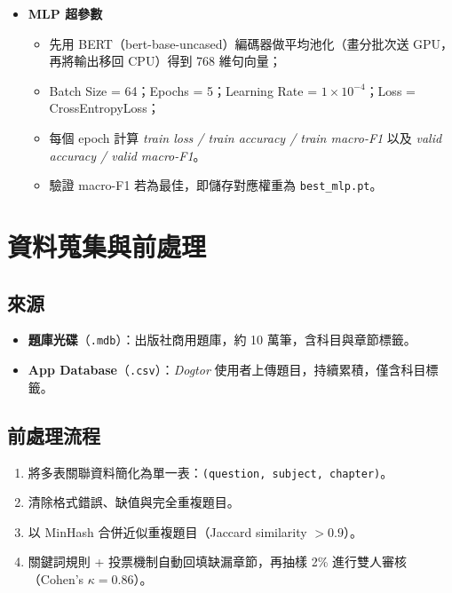 \documentclass[10pt,conference]{IEEEtran}
\begin{document}
\begin{CJK}{UTF8}{bsmi}
\begin{itemize}
  \item \textbf{MLP 超參數}  
    \begin{itemize}
      \item 先用 BERT（bert-base-uncased）編碼器做平均池化（畫分批次送 GPU，再將輸出移回 CPU）得到 768 維句向量；  
      \item Batch Size = 64；Epochs = 5；Learning Rate = $1\times10^{-4}$；Loss = CrossEntropyLoss；  
      \item 每個 epoch 計算 \textit{train loss / train accuracy / train macro-F1} 以及 \textit{valid accuracy / valid macro-F1}。  
      \item 驗證 macro-F1 若為最佳，即儲存對應權重為 \texttt{best\_mlp.pt}。  
    \end{itemize}
\end{itemize}

\section{資料蒐集與前處理}

\subsection{來源}
\begin{itemize}[nosep]
  \item \textbf{題庫光碟}（\texttt{.mdb}）：出版社商用題庫，約 10 萬筆，含科目與章節標籤。
  \item \textbf{App Database}（\texttt{.csv}）：\textit{Dogtor} 使用者上傳題目，持續累積，僅含科目標籤。
\end{itemize}

\subsection{前處理流程}
\begin{enumerate}[nosep]
  \item 將多表關聯資料簡化為單一表：\texttt{(question, subject, chapter)}。
  \item 清除格式錯誤、缺值與完全重複題目。
  \item 以 MinHash 合併近似重複題目（Jaccard similarity $>0.9$）。
  \item 關鍵詞規則 + 投票機制自動回填缺漏章節，再抽樣 2\% 進行雙人審核（Cohen’s $\kappa=0.86$）。
\end{enumerate}


\end{CJK}
\end{document}
